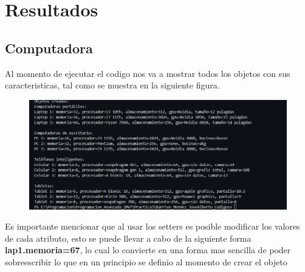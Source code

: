 \documentclass[12pt]{article}
\begin{document}
\section{Resultados}
\subsection{Computadora}
Al momento de ejecutar el codigo nos va a mostrar todos los objetos con sus caracteristicas, tal como se muestra en la siguiente figura.
 \begin{figure}[H]
		\begin{center}
 			\includegraphics[width = .9\textwidth]{08.png}
 			 	
		\end{center} 
\end{figure}
Es importante mencionar que al usar los setters es posible modificar los valores de cada atributo, esto se puede llevar a cabo de la siguiente forma  \textbf{lap1.memoria=67}, lo cual lo convierte en una forma mas sencilla de poder sobreescribir lo que en un principio se definio al momento de crear el objeto
\end{document}
